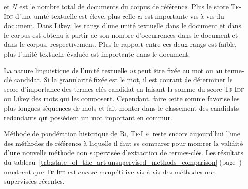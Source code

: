         et $N$ est le nombre total de documents du corpus de référence. Plus le
        score \textsc{Tf-Idf} d'une unité textuelle est élevé, plus celle-ci est
        importante vis-à-vis du document. Dans Likey, les rangs d'une unité
        textuelle dans le document et dans le corpus est obtenu à partir de son
        nombre d'occurrences dans le document et dans le corpus, respectivement.
        Plus le rapport entre ces deux rangs est faible, plus l'unité textuelle
        évaluée est importante dans le document.

        La nature linguistique de l'unité textuelle \textit{ut} peut être fixée
        au mot ou au terme-clé candidat. Si la granularité fixée est le mot, il
        est courant de déterminer le score d'importance des termes-clés candidat
        en faisant la somme du score \textsc{Tf-Idf} ou Likey des mots qui les
        composent. Cependant, faire cette somme favorise les plus longues
        séquences de mots et fait monter dans le classement des candidats
        redondants qui possèdent un mot important en commun.

        Méthode de pondération historique de \textsc{Ri}, \textsc{Tf-Idf} reste
        encore aujourd'hui l'une des méthodes de référence à laquelle il faut se
        comparer pour montrer la validité d'une nouvelle méthode non supervisée
        d'extraction de termes-clés. Les résultats du
        tableau~\ref{tab:state_of_the_art-unsupervised_methods_comparison}
        (page~\pageref{tab:state_of_the_art-unsupervised_methods_comparison})
        montrent que \textsc{Tf-Idf} est encore compétitive vis-à-vis des
        méthodes non supervisées récentes.

